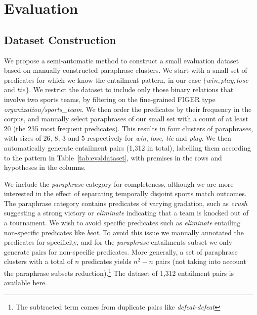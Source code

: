 \documentclass[11pt]{article}
\newcommand{\myul}[2][black]{\setulcolor{#1}\ul{#2}\setulcolor{black}}
\begin{document}
\section{Evaluation}
\label{sec:evaluation}

\subsection{Dataset Construction}
\label{subsec:dataset}

We propose a semi-automatic method to construct a small evaluation dataset based on manually constructed paraphrase clusters. We start with a small set of predicates for which we know the entailment pattern, in our case $\{win, play, lose$ and $tie\}$. We restrict the dataset to include only those binary relations that involve two sports teams, by filtering on the fine-grained FIGER \cite{ling2012} type \textit{organization/sports\_team}. We then order the predicates by their frequency in the corpus, and manually select paraphrases of our small set with a count of at least 20 (the 235 most frequent predicates). This results in four clusters of paraphrases, with sizes of 26, 8, 3 and 5 respectively for \textit{win}, \textit{lose}, \textit{tie} and \textit{play}. We then automatically generate entailment pairs (1,312 in total), labelling them according to the pattern in Table~\ref{tab:evaldataset}, with premises in the rows and hypotheses in the columns.

We include the \textit{paraphrase} category for completeness, although we are more interested in the effect of separating temporally disjoint sports match outcomes. The paraphrase category contains predicates of varying gradation, such as \textit{crush} suggesting a strong victory or \textit{eliminate} indicating that a team is knocked out of a tournament. We wish to avoid specific predicates such as \textit{eliminate} entailing non-specific predicates like \textit{beat}. To avoid this issue we manually annotated the predicates for specificity, and for the \textit{paraphrase} entailments subset we only generate pairs for non-specific predicates. More generally, a set of paraphrase clusters with a total of $n$ predicates yields $n^2 - n$ pairs (not taking into account the paraphrase subsets reduction).\footnote{The subtracted term comes from duplicate pairs like \textit{defeat}-\textit{defeat}} The dataset of 1,312 entailment pairs is available \href{https://gitlab.com/lianeg/temporal-entailment-sports-dataset}{\color{blue} \myul[blue] {here}}.
\end{document}

